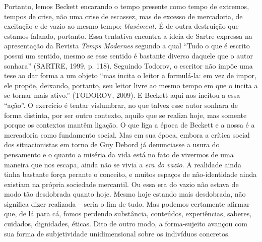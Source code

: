 Portanto, lemos Beckett encarando o tempo presente como tempo de
extremos, tempos de crise, não uma crise de escassez, mas de excesso de
mercadoria, de excitação e de vazio ao mesmo tempo: \emph{blasément.} É
de outra destruição que estamos falando, portanto. Essa tentativa
encontra a ideia de Sartre expressa na apresentação da Revista
\emph{Temps} \emph{Modernes} segundo a qual ``Tudo o que é escrito
possui um sentido, mesmo se esse sentido é bastante diverso daquele que
o autor sonhara'' (SARTRE, 1999, p. 118). Seguindo Todorov, o escritor
não impõe uma tese ao dar forma a um objeto ``mas incita o leitor a
formulá-la: em vez de impor, ele propõe, deixando, portanto, seu leitor
livre ao mesmo tempo em que o incita a se tornar mais ativo.'' (TODOROV,
2009). E Beckett aqui nos incitou a essa ``ação''. O exercício é tentar
vislumbrar, no que talvez esse autor sonhara de forma distinta, por ser
outro contexto, aquilo que se realiza hoje, mas somente porque os
contextos mantêm ligação. O que liga a época de Beckett e a nossa é a
mercadoria como fundamento social. Mas em sua época, embora a crítica
social dos situacionistas em torno de Guy Debord já denunciasse a usura
do pensamento e o quanto a miséria da vida está no fato de vivermos de
uma maneira que nos escapa, ainda não se vivia a \emph{era do vazio}. A
realidade ainda tinha bastante força perante o conceito, e muitos
espaços de não-identidade ainda existiam na própria sociedade mercantil.
Ou essa era do vazio não estava de modo tão desdobrada quanto hoje.
Mesmo hoje estando mais desdobrada, não significa dizer realizada --
seria o fim de tudo. Mas podemos certamente afirmar que, de lá para cá,
fomos perdendo substância, conteúdos, experiências, saberes, cuidados,
dignidades, éticas. Dito de outro modo, a forma-sujeito avançou com sua
forma de subjetividade unidimensional sobre os indivíduos concretos.

